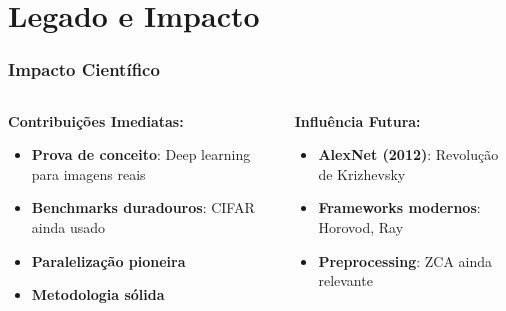 \documentclass[aspectratio=169]{beamer}
\begin{document}
\section{Legado e Impacto}

\begin{frame}
\frametitle{Impacto Científico}
\begin{columns}
\begin{column}{0.5\textwidth}
\textbf{Contribuições Imediatas:}
\begin{itemize}
    \item \textcolor{azulescuro}{\textbf{Prova de conceito}}: Deep learning para imagens reais
    \item \textcolor{azulescuro}{\textbf{Benchmarks duradouros}}: CIFAR ainda usado
    \item \textcolor{azulescuro}{\textbf{Paralelização pioneira}}
    \item \textcolor{azulescuro}{\textbf{Metodologia sólida}}
\end{itemize}
\end{column}
\begin{column}{0.5\textwidth}
\textbf{Influência Futura:}
\begin{itemize}
    \item \textcolor{azulescuro}{\textbf{AlexNet (2012)}}: Revolução de Krizhevsky
    \item \textcolor{azulescuro}{\textbf{Frameworks modernos}}: Horovod, Ray
    \item \textcolor{azulescuro}{\textbf{Preprocessing}}: ZCA ainda relevante
\end{itemize}
\end{column}
\end{columns}
\end{frame}
\end{document}
